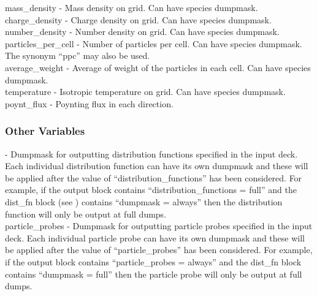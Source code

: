 {\emphtext mass\_density} - Mass density on grid. Can have species dumpmask.\\

{\emphtext charge\_density} - Charge density on grid. Can have species
dumpmask.\\

{\emphtext number\_density} - Number density on grid. Can have species
dumpmask.\\

{\emphtext particles\_per\_cell} - Number of particles per cell. Can have
species dumpmask.  The synonym ``ppc'' may also be used.\\

{\emphtext average\_weight} - Average of weight of the particles in each cell.
Can have species dumpmask.\\

{\emphtext temperature} - Isotropic temperature on grid. Can have species
dumpmask.\\

{\emphtext poynt\_flux} - Poynting flux in each direction.\\


\subsubsection{Other Variables}

\hspace*{\parindent}%
{} - Dumpmask for outputting distribution
functions specified in the input deck. Each individual distribution function
can have its own dumpmask and these will be applied after the value of
``distribution\_functions'' has been considered. For example, if the
output block contains ``distribution\_functions = full'' and the dist\_fn
block (see ) contains ``dumpmask = always'' then the
distribution function will only be output at full dumps.\\

{\emphtext particle\_probes} - Dumpmask for outputting particle
probes specified in the input deck. Each individual particle probe
can have its own dumpmask and these will be applied after the value of
``particle\_probes'' has been considered. For example, if the
output block contains ``particle\_probes = always'' and the dist\_fn
block contains ``dumpmask = full'' then the particle probe will
only be output at full dumps.\\

